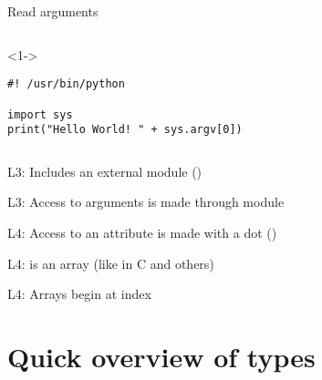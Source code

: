 \begin{frame}[fragile]{Read arguments}

  \begin{columns}[onlytextwidth]
    \begin{column}{\textwidth}
      \begin{onlyenv}<1->
        \begin{lstlisting}[style=python]
#! /usr/bin/python

import sys
print("Hello World! " + sys.argv[0]) \end{lstlisting}
      \end{onlyenv}
    \end{column}
  \end{columns}

   L3: Includes an external module ()

   L3: Access to arguments is made through  module

   L4: Access to an attribute is made with a dot ()

   L4:  is an array (like in C and others)

   L4: Arrays begin at index 

\end{frame}


\section{Quick overview of types}

